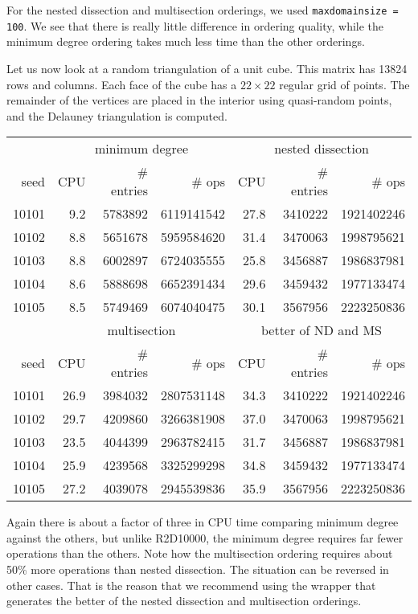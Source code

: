 For the nested dissection and multisection orderings, we used
{\tt maxdomainsize = 100}.
We see that there is really little difference in ordering quality,
while the minimum degree ordering takes much less time than the
other orderings.
\par
Let us now look at a random triangulation of a unit cube.
This matrix has 13824 rows and columns.
Each face of the cube has a $22 \times 22$ regular grid of points.
The remainder of the vertices are placed in the interior using 
quasi-random points, and the Delauney triangulation is computed.
\begin{center}
\begin{tabular}{rrrrrrr}
& \multicolumn{3}{c}{minimum degree} 
& \multicolumn{3}{c}{nested dissection} \\
seed & CPU & \# entries & \# ops & CPU & \# entries & \# ops \\
10101 & 9.2 & 5783892 & 6119141542 & 27.8 & 3410222 & 1921402246 \\
10102 & 8.8 & 5651678 & 5959584620 & 31.4 & 3470063 & 1998795621 \\
10103 & 8.8 & 6002897 & 6724035555 & 25.8 & 3456887 & 1986837981 \\
10104 & 8.6 & 5888698 & 6652391434 & 29.6 & 3459432 & 1977133474 \\
10105 & 8.5 & 5749469 & 6074040475 & 30.1 & 3567956 & 2223250836 \\
& \multicolumn{3}{c}{multisection} 
& \multicolumn{3}{c}{better of ND and MS} \\
seed & CPU & \# entries & \# ops & CPU & \# entries & \# ops \\
10101 & 26.9 & 3984032 & 2807531148 & 34.3 & 3410222 & 1921402246 \\
10102 & 29.7 & 4209860 & 3266381908 & 37.0 & 3470063 & 1998795621 \\
10103 & 23.5 & 4044399 & 2963782415 & 31.7 & 3456887 & 1986837981 \\
10104 & 25.9 & 4239568 & 3325299298 & 34.8 & 3459432 & 1977133474 \\
10105 & 27.2 & 4039078 & 2945539836 & 35.9 & 3567956 & 2223250836
\end{tabular}
\end{center}
Again there is about a factor of three in CPU time comparing
minimum degree against the others,
but unlike R2D10000, the minimum degree requires far
fewer operations than the others.
Note how the multisection ordering requires about 50\% more
operations than nested dissection.
The situation can be reversed in other cases.
That is the reason that we recommend using the wrapper that
generates the better of the nested dissection and multisection
orderings.
